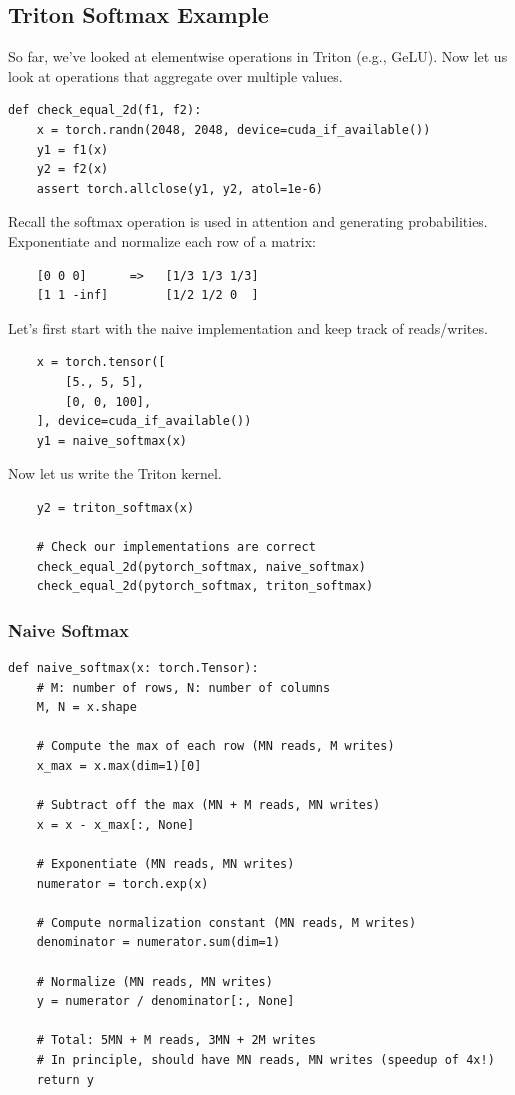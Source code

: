\documentclass[12pt,twoside]{article}
\begin{document}
\subsection*{Triton Softmax Example}

So far, we've looked at elementwise operations in Triton (e.g., GeLU). Now let us look at operations that aggregate over multiple values. 

\begin{verbatim}
def check_equal_2d(f1, f2):
    x = torch.randn(2048, 2048, device=cuda_if_available())
    y1 = f1(x)
    y2 = f2(x)
    assert torch.allclose(y1, y2, atol=1e-6)
\end{verbatim}

Recall the softmax operation is used in attention and generating probabilities. Exponentiate and normalize each row of a matrix:

\begin{verbatim}
    [0 0 0]      =>   [1/3 1/3 1/3]
    [1 1 -inf]        [1/2 1/2 0  ]
\end{verbatim}

Let's first start with the naive implementation and keep track of reads/writes.

\begin{verbatim}
    x = torch.tensor([
        [5., 5, 5],
        [0, 0, 100],
    ], device=cuda_if_available())
    y1 = naive_softmax(x) 
\end{verbatim}

Now let us write the Triton kernel.

\begin{verbatim}
    y2 = triton_softmax(x)  
    
    # Check our implementations are correct
    check_equal_2d(pytorch_softmax, naive_softmax) 
    check_equal_2d(pytorch_softmax, triton_softmax) 
\end{verbatim}

\subsubsection*{Naive Softmax}

\begin{verbatim}
def naive_softmax(x: torch.Tensor):
    # M: number of rows, N: number of columns
    M, N = x.shape
    
    # Compute the max of each row (MN reads, M writes)
    x_max = x.max(dim=1)[0]
    
    # Subtract off the max (MN + M reads, MN writes)
    x = x - x_max[:, None]
    
    # Exponentiate (MN reads, MN writes)
    numerator = torch.exp(x)
    
    # Compute normalization constant (MN reads, M writes)
    denominator = numerator.sum(dim=1)
    
    # Normalize (MN reads, MN writes)
    y = numerator / denominator[:, None]
    
    # Total: 5MN + M reads, 3MN + 2M writes
    # In principle, should have MN reads, MN writes (speedup of 4x!)
    return y
\end{verbatim}
\end{document}
